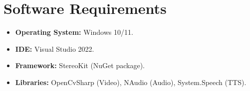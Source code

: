 \section{Software Requirements}
\begin{itemize}
    \item \textbf{Operating System:} Windows 10/11.
    \item \textbf{IDE:} Visual Studio 2022.
    \item \textbf{Framework:} StereoKit (NuGet package).
    \item \textbf{Libraries:} OpenCvSharp (Video), NAudio (Audio), System.Speech (TTS).
\end{itemize}
